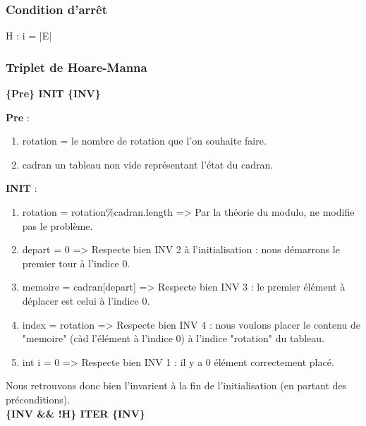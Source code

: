 \documentclass[a4paper, 12pt]{report}
\begin{document}
\subsubsection*{Condition d'arrêt}

H : i = |E|

\subsubsection{Triplet de Hoare-Manna}
\vspace{0.2cm}

\textbf{\{Pre\} INIT \{INV\}}
\vspace{0.2cm}

\textbf{Pre} :
\begin{enumerate}
 \item rotation = le nombre de rotation que l'on souhaite faire. 
 \item cadran un tableau non vide représentant l'état du cadran.
\end{enumerate}

\vspace{0.2cm}

\textbf{INIT} :

\begin{enumerate}

\item rotation = rotation\%cadran.length => Par la théorie du modulo, ne modifie pas le problème.

\item depart = 0 => Respecte bien INV 2 à l'initialisation : nous démarrons le premier tour à l'indice 0.

\item memoire = cadran[depart] => Respecte bien INV 3 : le premier élément à déplacer est celui à l'indice 0.

\item  index = rotation => Respecte bien INV 4 : nous voulons placer le contenu de "memoire" (càd l'élément à l'indice 0) à l'indice "rotation" du tableau.
        
\item int i = 0 => Respecte bien INV 1 : il y a 0 élément correctement placé.
\end{enumerate}
\vspace{0.3cm}

Nous retrouvons donc bien l'invarient à la fin de l'initialisation (en partant des préconditions). \\

\textbf{\{INV && !H\} ITER \{INV\}}
\end{document}
